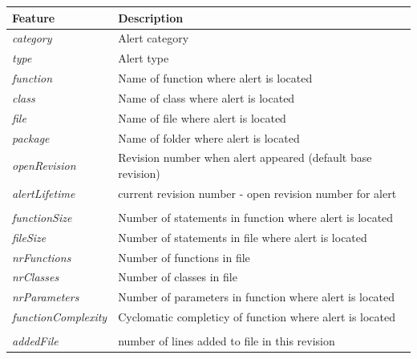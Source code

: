 \begin{table}[H]
	\centering
	\begin{tabular}{@{}ll@{}}
		\toprule
		\textbf{Feature}            & \textbf{Description}                                               \\ \midrule
		\textit{category}           & Alert category                                                     \\
		\textit{type}               & Alert type                                                         \\
		\textit{function}           & Name of function where alert is located                            \\
		\textit{class}              & Name of class where alert is located                               \\
		\textit{file}               & Name of file where alert is located                                \\
		\textit{package}            & Name of folder where alert is located                              \\
		\textit{openRevision}       & Revision number when alert appeared (default base revision)        \\
		\textit{alertLifetime}      & current revision number - open revision number for alert           \\
		\textit{}                   &                                                                    \\
		\textit{functionSize}       & Number of statements in function where alert is located            \\
		\textit{fileSize}           & Number of statements in file where alert is located                \\
		\textit{nrFunctions}        & Number of functions in file                                        \\
		\textit{nrClasses}          & Number of classes in file                                          \\
		\textit{nrParameters}       & Number of parameters in function where alert is located            \\
		\textit{functionComplexity} & Cyclomatic completicy of function where alert is located           \\
		\textit{}                   &                                                                    \\
		\textit{addedFile}          & number of lines added to file in this revision                     \\

\end{tabular}
\end{table}

